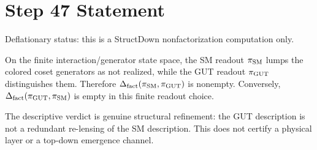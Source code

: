 \documentclass[11pt]{article}
\begin{document}
\section*{Step 47 Statement}
Deflationary status: this is a StructDown nonfactorization computation only.

On the finite interaction/generator state space, the SM readout \(\pi_{\rm SM}\) lumps the colored coset generators as not realized, while the GUT readout \(\pi_{\rm GUT}\) distinguishes them. Therefore \(\Delta_{\rm fact}(\pi_{\rm SM},\pi_{\rm GUT})\) is nonempty. Conversely, \(\Delta_{\rm fact}(\pi_{\rm GUT},\pi_{\rm SM})\) is empty in this finite readout choice.

The descriptive verdict is genuine structural refinement: the GUT description is not a redundant re-lensing of the SM description. This does not certify a physical layer or a top-down emergence channel.
\end{document}

